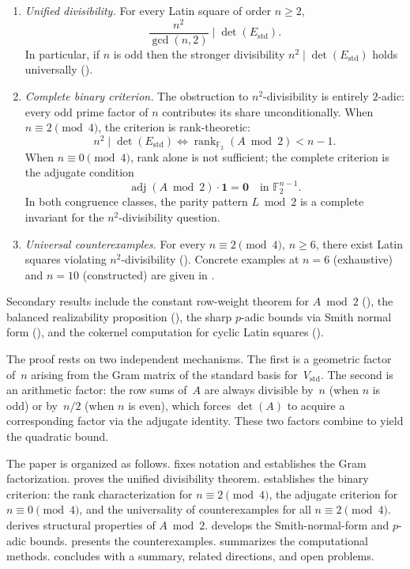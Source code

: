 \documentclass[11pt,a4paper]{article}
\newcommand{\FF}{\mathbb{F}}
\newcommand{\one}{\mathbf{1}}
\newcommand{\rank}{\operatorname{rank}}
\newcommand{\adj}{\operatorname{adj}}
\newcommand{\Estd}{E_{\mathrm{std}}}
\newcommand{\Vstd}{V_{\mathrm{std}}}
\begin{document}
\begin{enumerate}[label=(\alph*),leftmargin=2em]
  \item \emph{Unified divisibility.} For every Latin square of order
        $n\ge 2$,
        \[
          \frac{n^2}{\gcd(n,2)} \;\Big|\; \det(\Estd).
        \]
        In particular, if $n$ is odd then the stronger divisibility
        $n^2\mid\det(\Estd)$ holds universally ().

  \item \emph{Complete binary criterion.} The obstruction to
        $n^2$-divisibility is entirely $2$-adic: every odd prime factor of
        $n$ contributes its share unconditionally.  When
        $n\equiv 2\pmod{4}$, the criterion is rank-theoretic:
        \[
          n^2\mid\det(\Estd)
          \iff
          \rank_{\FF_2}(A\bmod 2)<n-1.
        \]
        When $n\equiv 0\pmod{4}$, rank alone is not sufficient; the
        complete criterion is the adjugate condition
        \[
          \adj(A\bmod 2)\cdot\one=\mathbf{0}
          \quad\text{in }\FF_2^{n-1}.
        \]
        In both congruence classes, the parity pattern $L\bmod 2$ is a
        complete invariant for the $n^2$-divisibility question.

  \item \emph{Universal counterexamples.} For every
        $n\equiv 2\pmod{4}$, $n\ge 6$, there exist Latin squares
        violating $n^2$-divisibility
        ().  Concrete examples at
        $n=6$ (exhaustive) and $n=10$ (constructed) are given in
        .
\end{enumerate}

Secondary results include the constant row-weight theorem for $A\bmod 2$
(), the balanced realizability proposition
(), the sharp $p$-adic bounds via Smith normal
form (), and the cokernel computation for
cyclic Latin squares ().

The proof rests on two independent mechanisms.  The first is a geometric
factor of~$n$ arising from the Gram matrix of the standard basis for~$\Vstd$.  The second is an arithmetic factor: the row sums of~$A$ are
always divisible by~$n$ (when $n$ is odd) or by~$n/2$ (when $n$ is even),
which forces $\det(A)$ to acquire a corresponding factor via the adjugate
identity.  These two factors combine to yield the quadratic bound.

The paper is organized as follows.   fixes notation and
establishes the Gram factorization.   proves the
unified divisibility theorem.   establishes the
binary criterion: the rank characterization for $n\equiv 2\pmod{4}$,
the adjugate criterion for $n\equiv 0\pmod{4}$, and the
universality of counterexamples for all $n\equiv 2\pmod{4}$.
 derives structural properties of $A\bmod 2$.
 develops the Smith-normal-form and $p$-adic bounds.
 presents the counterexamples.
 summarizes the computational methods.
 concludes with a summary, related directions, and
open problems.
\end{document}
